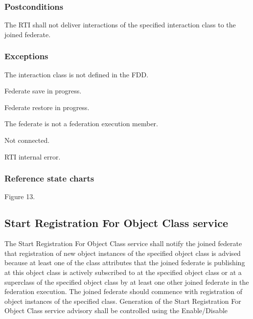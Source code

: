 \begin{compactstdpage}
    \subsubsection{Postconditions}
    \begin{stdalphalist}
        \item The RTI shall not deliver interactions of the specified interaction class to the joined federate.
    \end{stdalphalist}

    \subsubsection{Exceptions}
    \begin{stdalphalist}
        \item The interaction class is not defined in the FDD.
        \item Federate save in progress.
        \item Federate restore in progress.
        \item The federate is not a federation execution member.
        \item Not connected.
        \item RTI internal error.
    \end{stdalphalist}

    \subsubsection{Reference state charts}
    \begin{stdalphalist}
        \item Figure 13.
    \end{stdalphalist}

    \subsection{Start Registration For Object Class \rtiinitiated{} service}

    The Start Registration For Object Class \rtiinitiated{} service shall notify the joined federate that registration of new object instances of the specified object class is advised because at least one of the class attributes that the joined federate is publishing at this object class is actively subscribed to at the specified object class or at a superclass of the specified object class by at least one other joined federate in the federation execution. The joined federate should commence with registration of object instances of the specified class. Generation of the Start Registration For Object Class \rtiinitiated{} service advisory shall be controlled using the Enable/Disable
\end{compactstdpage}

